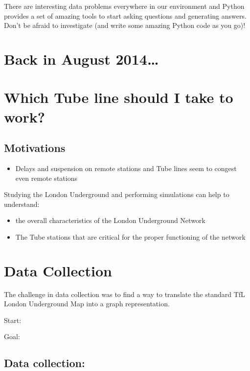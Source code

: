 \documentclass{article}
\begin{document}
There are interesting data problems everywhere in our environment and
Python provides a set of amazing tools to start asking questions and
generating answers. Don't be afraid to investigate (and write some
amazing Python code as you go)!

    \section{Back in August 2014\ldots{}}\label{back-in-august-2014}

    \section{Which Tube line should I take to
work?}\label{which-tube-line-should-i-take-to-work}

    \subsection{Motivations}\label{motivations}

\begin{itemize}
\itemsep1pt\parskip0pt
\item
  Delays and suspension on remote stations and Tube lines seem to
  congest even remote stations
\end{itemize}

Studying the London Underground and performing simulations can help to
understand:

\begin{itemize}
\itemsep1pt\parskip0pt
\item
  the overall characteristics of the London Underground Network
\item
  The Tube stations that are critical for the proper functioning of the
  network
\end{itemize}

    \section{Data Collection}\label{data-collection}

The challenge in data collection was to find a way to translate the
standard TfL London Underground Map into a graph representation.

Start:

Goal:

    \subsection{Data collection:}\label{data-collection}
\end{document}
